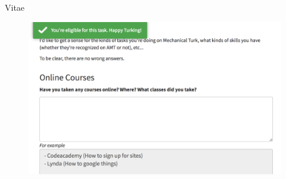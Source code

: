 \documentclass[presentation]{subfiles}
\begin{document}
\begin{frame}{Vitae}
\begin{figure}
\begin{columns}
\begin{column}{0.45\textwidth}
  \vspace{4mm}
  \includegraphics[width=\textwidth]{../common_figures/eligible.png}
  \end{column}
  \end{columns}
  \end{figure}
\end{frame}

\end{document}
